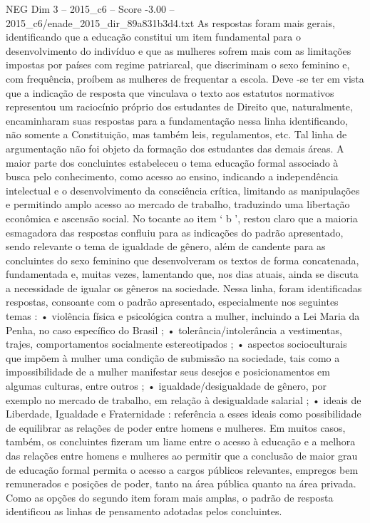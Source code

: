 \begin{textsample}{NEG Dim 3 – 2015\_c6 – Score -3.00 – 2015\_c6/enade\_2015\_dir\_89a831b3d4.txt}
As respostas foram mais gerais, identificando que a educação constitui um item fundamental para o desenvolvimento do indivíduo e que as mulheres sofrem mais com as limitações impostas por países com regime patriarcal, que discriminam o sexo feminino e, com frequência, proíbem as mulheres de frequentar a escola.
Deve -se ter em vista que a indicação de resposta que vinculava o texto aos estatutos normativos representou um raciocínio próprio dos estudantes de Direito que, naturalmente, encaminharam suas respostas para a fundamentação nessa linha identificando, não somente a Constituição, mas também leis, regulamentos, etc.
Tal linha de argumentação não foi objeto da formação dos estudantes das demais áreas.
A maior parte dos concluintes estabeleceu o tema educação formal associado à busca pelo conhecimento, como acesso ao ensino, indicando a independência intelectual e o desenvolvimento da consciência crítica, limitando as manipulações e permitindo amplo acesso ao mercado de trabalho, traduzindo uma libertação econômica e ascensão social.
No tocante ao item ‘ b ’, restou claro que a maioria esmagadora das respostas confluiu para as indicações do padrão apresentado, sendo relevante o tema de igualdade de gênero, além de candente para as concluintes do sexo feminino que desenvolveram os textos de forma concatenada, fundamentada e, muitas vezes, lamentando que, nos dias atuais, ainda se discuta a necessidade de igualar os gêneros na sociedade.
Nessa linha, foram identificadas respostas, consoante com o padrão apresentado, especialmente nos seguintes temas : • violência física e psicológica contra a mulher, incluindo a Lei Maria da Penha, no caso específico do Brasil ; • tolerância/intolerância a vestimentas, trajes, comportamentos socialmente estereotipados ; • aspectos socioculturais que impõem à mulher uma condição de submissão na sociedade, tais como a impossibilidade de a mulher manifestar seus desejos e posicionamentos em algumas culturas, entre outros ; • igualdade/desigualdade de gênero, por exemplo no mercado de trabalho, em relação à desigualdade salarial ; • ideais de Liberdade, Igualdade e Fraternidade : referência a esses ideais como possibilidade de equilibrar as relações de poder entre homens e mulheres.
Em muitos casos, também, os concluintes fizeram um liame entre o acesso à educação e a melhora das relações entre homens e mulheres ao permitir que a conclusão de maior grau de educação formal permita o acesso a cargos públicos relevantes, empregos bem remunerados e posições de poder, tanto na área pública quanto na área privada.
Como as opções do segundo item foram mais amplas, o padrão de resposta identificou as linhas de pensamento adotadas pelos concluintes.

\end{textsample}
